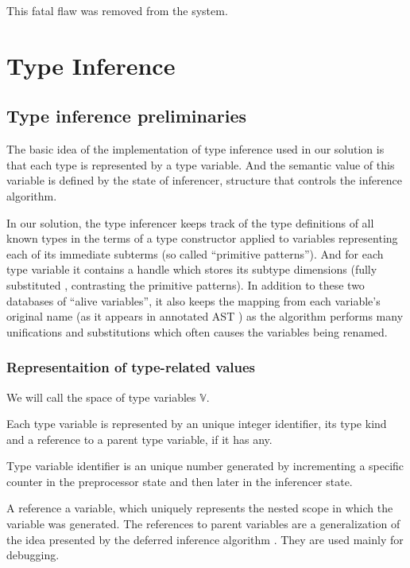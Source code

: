This fatal flaw was removed from the system.

\section{Type Inference}

\subsection{Type inference preliminaries}

The basic idea of the implementation of type inference used in our solution is that each type is represented by a type variable. And the semantic value of this variable is defined by the state of inferencer, structure that controls the inference algorithm.

In our solution, the type inferencer keeps track of the type definitions of all known types in the terms of a type constructor applied to variables representing each of its immediate subterms (so called ``primitive patterns''). And for each type variable it contains a handle which stores its subtype dimensions (fully substituted , contrasting the primitive patterns). In addition to these two databases of ``alive variables'', it also keeps the mapping from each variable's original name (as it appears in annotated AST ) as the algorithm performs many unifications and substitutions which often causes the variables being renamed.

\subsubsection{Representaition of type-related values}

\begin{defn}
    We will call the space of type variables $\mathbb{V}$.

    Each type variable is represented by an unique integer identifier, its type kind and a reference to a parent type variable, if it has any.
\end{defn}

\begin{remark}
    Type variable identifier is an unique number generated by incrementing a specific counter in the preprocessor state  and then later in the inferencer state.
\end{remark}

\begin{remark}
    A reference a variable, which uniquely represents the nested scope in which the variable was generated. The references to parent variables are a generalization of the idea presented by the deferred inference algorithm  . They are used mainly for debugging.
\end{remark}

